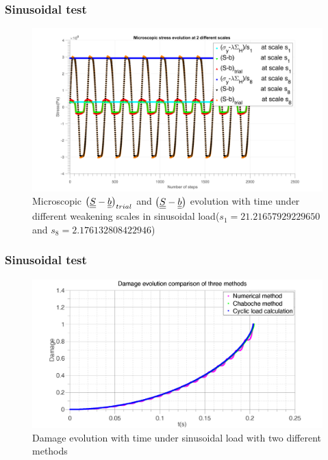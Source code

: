 \documentclass[xcolor=table]{Bredelebeamer}
\begin{document}
\begin{frame}
	\frametitle{Sinusoidal test}
\begin{figure}[!h]
	\centering
	\includegraphics[width=\textwidth]{figures//trialsin.png} 
	\caption{Microscopic $\left( \uline{\uline{S}}-\uline{\uline{b}}\right)_{trial}$ and $\left( \uline{\uline{S}}-\uline{\uline{b}}\right)$ evolution with time under different weakening scales in sinusoidal load($s_1=21.21657929229650$ and $s_8=2.176132808422946$)}
	\label{trialsin}
\end{figure}
\end{frame}	
\begin{frame}
	\frametitle{Sinusoidal test}
\begin{figure}[!h]
	\centering
	\includegraphics[width=\textwidth]{figures//damagesin.png} 
	\caption{Damage evolution with time under sinusoidal load with two different methods}
	\label{damsin}
\end{figure}
\end{frame}	
\end{document}
